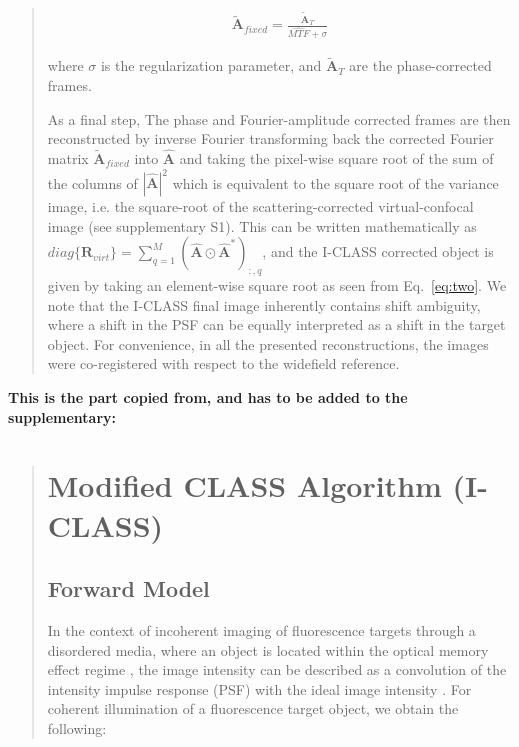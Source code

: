 \documentclass[12pt]{article}
\newenvironment{ourresponse}
    {\begin{tcolorbox}[width=\linewidth,breakable,enhanced,colback=gray!5,colframe=responsecolor!50,title=Response,left=5pt,right=5pt]}
    {\end{tcolorbox}}
\begin{document}
\begin{enumerate}[label=\arabic*.]
\begin{ourresponse}
\begin{quote}
            \begin{eqnarray}
            \tilde{\textbf{A}}_{fixed}=\frac{\tilde{\textbf{A}}_T}{\widehat{MTF}+\sigma}
            \end{eqnarray}
            
            
            \noindent where $\sigma$ is the regularization parameter, and $\tilde{\textbf{A}}_T$ are the phase-corrected frames.  
            
            As a final step, The phase and Fourier-amplitude corrected frames are then reconstructed by inverse Fourier transforming back the corrected Fourier matrix $\tilde{\textbf{A}}_{fixed}$ into $\hat{\textbf{A}}$ and taking the pixel-wise square root of the sum of the columns of $|\hat{\textbf{A}}|^2$ which is equivalent to the square root of the variance image, i.e. the square-root of the scattering-corrected virtual-confocal image (see supplementary S1). This can be written mathematically as $diag\{ \textbf{R}_{virt} \} = \sum_{q=1}^{M} (\hat{\textbf{A}} \odot \hat{\textbf{A}}^*)_{:,q}$, and the I-CLASS corrected object 
            is given by taking an element-wise square root as seen from Eq.~\ref{eq:two}. We note that the I-CLASS final image inherently contains shift ambiguity, where a shift in the PSF can be equally interpreted as a shift in the target object. For convenience, in all the presented reconstructions, the images were co-registered with respect to the widefield reference.

        \end{quote}

        \textbf{This is the part copied from, and has to be added to the supplementary:}
        \begin{quote}
            \section{Modified CLASS Algorithm (I-CLASS)}
            \subsection*{Forward Model}
            
            In the context of incoherent imaging of fluorescence targets through a disordered media, where an object is located within the optical memory effect regime \cite{feng1988correlations}, the image intensity can be described as a convolution of the intensity impulse response (PSF) with the ideal image intensity \cite{goodman2005introduction}.
            For coherent illumination of a fluorescence target object, we obtain the following:
            

\end{quote}
\end{ourresponse}
\end{enumerate}
\end{document}
